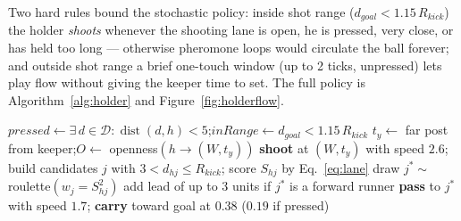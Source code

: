 \documentclass[11pt,a4paper]{article}
\begin{document}
Two hard rules bound the stochastic policy: inside shot range ($d_{goal} < 1.15\,R_{kick}$) the
holder \emph{shoots} whenever the shooting lane is open, he is pressed, very close, or has held
too long --- otherwise pheromone loops would circulate the ball forever; and outside shot range
a brief one-touch window (up to 2 ticks, unpressed) lets play flow without giving the keeper
time to set. The full policy is Algorithm~\ref{alg:holder} and Figure~\ref{fig:holderflow}.

\begin{algorithm}[H]
\caption{Swarm holder policy (one tick, ball held by $h$)}\label{alg:holder}
\begin{algorithmic}[1]
\State $pressed \gets \exists\, d \in \mathcal{D}: \operatorname{dist}(d,h) < 5$;\quad $inRange \gets d_{goal} < 1.15\,R_{kick}$
 \Return {}
\EndIf
{} 
  \State $t_y \gets$ far post from keeper;\quad $O \gets$ openness$(h \to (W, t_y))$
    \State \textbf{shoot} at $(W, t_y)$ with speed $2.6$; \Return
  \EndIf
\EndIf
\State build candidates $j$ with $3 < d_{hj} \le R_{kick}$; score $S_{hj}$ by Eq.~\eqref{eq:lane}
  \State draw $j^\ast \sim$ roulette$(w_j = S_{hj}^2)$ 
  \State add lead of up to $3$ units if $j^\ast$ is a forward runner 
  \State \textbf{pass} to $j^\ast$ with speed $1.7$; \Return
\EndIf
\State \textbf{carry} toward goal at $0.38$ ($0.19$ if pressed) 
\end{algorithmic}
\end{algorithm}
\end{document}
